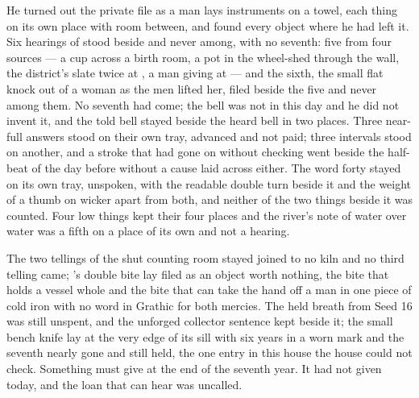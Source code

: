 He turned out the private file as a man lays instruments on a towel, each thing on its own place with room between, and found every object where he had left it. Six hearings of  stood beside and never among, with no seventh: five from four sources --- a cup across a birth room, a pot in the wheel-shed through the wall, the district's slate twice at , a man giving at  --- and the sixth, the small flat knock out of a woman as the men lifted her, filed beside the five and never among them. No seventh had come; the bell was not in this day and he did not invent it, and the told bell stayed beside the heard bell in two places. Three near-full answers stood on their own tray, advanced and not paid; three intervals stood on another, and a stroke that had gone on without checking went beside the half-beat of the day before without a cause laid across either. The word forty stayed on its own tray, unspoken, with the readable double turn beside it and the weight of a thumb on wicker apart from both, and neither of the two things beside it was counted. Four low things kept their four places and the river's note of water over water was a fifth on a place of its own and not a hearing.

The two tellings of the shut counting room stayed joined to no kiln and no third telling came; 's double bite lay filed as an object worth nothing, the bite that holds a vessel whole and the bite that can take the hand off a man in one piece of cold iron with no word in Grathic for both mercies. The held breath from Seed 16 was still unspent, and the unforged collector sentence kept beside it; the small bench knife lay at the very edge of its sill with six years in a worn mark and the seventh nearly gone and still held, the one entry in this house the house could not check. Something must give at the end of the seventh year. It had not given today, and the loan that can hear was uncalled.

